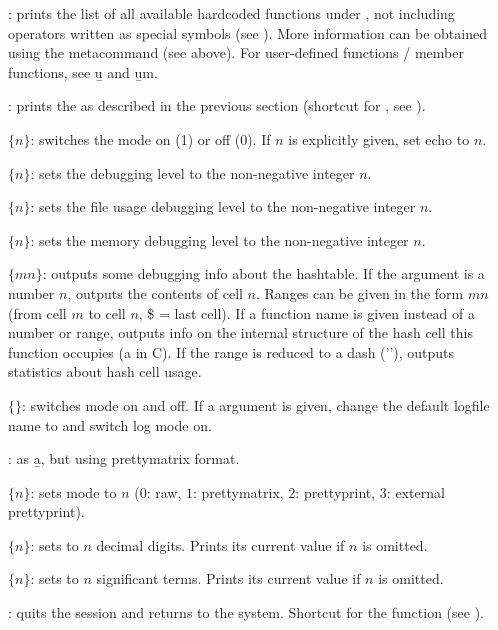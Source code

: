 : prints the list of all available
hardcoded functions under , not including operators written as special
symbols (see ). More information can be obtained using
the  metacommand (see above). For user-defined functions / member
functions, see \b{u} and \b{um}.

: prints the  as described in the
previous section (shortcut for , see ).

 $\{n\}$: switches the  mode on (1) or off (0). If
$n$ is explicitly given, set echo to $n$.

 $\{n\}$: sets the debugging level  to the
non-negative integer $n$.

 $\{n\}$: sets the file usage debugging level 
to the non-negative integer $n$.

 $\{n\}$: sets the memory debugging level 
to the non-negative integer $n$.

 $\{m$\kbd{-}$n\}$: outputs some debugging info about the
hashtable. If the argument is a number $n$, outputs the contents of cell
$n$. Ranges can be given in the form $m$\kbd{-}$n$ (from cell $m$ to cell
$n$, \$ = last cell). If a function name is given instead of a number or
range, outputs info on the internal structure of the hash cell this
function occupies (a  in C). If the range is reduced to
a dash ('\kbd{-}'), outputs statistics about hash cell usage.

 $\{$$\}$: switches  mode on and off.
If a  argument is given, change the default logfile name to
 and switch log mode on.

: as \b{a}, but using prettymatrix format.

 $\{n\}$: sets  mode to $n$ ($0$: raw, $1$:
prettymatrix, $2$: prettyprint, $3$: external prettyprint).

 $\{n\}$: sets  to $n$ decimal
digits. Prints its current value if $n$ is omitted.

 $\{n\}$: sets  to $n$ significant terms.
Prints its current value if $n$ is omitted.

: quits the  session and returns to the system.
Shortcut for the function  (see ).

